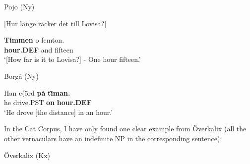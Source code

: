 Pojo (Ny)



[Hur länge räcker det till Lovisa?]


 \ea\label{}
\gll \textbf{Timmen} o  femton.\\


\textbf{hour.DEF} and  fifteen\\

\glt ‘[How far is it to Lovisa?] - One hour fifteen.’

\z

\item 

Borgå (Ny)



 \ea\label{}
\gll Han  c(\={ö}rd  \textbf{på} \textbf{t}\textbf{\=\i}\textbf{man.}\\


he  drive.PST  \textbf{on} \textbf{hour.DEF}\\

\glt ‘He drove [the distance] in an hour.’

\z

In the Cat Corpus, I have only found one clear example from Överkalix (all the other vernaculars have an indefinite NP in the corresponding sentence):


\item 

Överkalix (Kx) 



